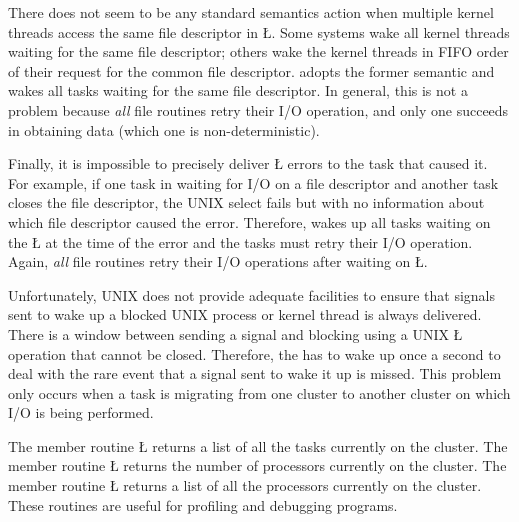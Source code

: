 \documentclass[openright,twoside]{report}
\begin{document}
There does not seem to be any standard semantics action when multiple kernel threads access the same file descriptor in \LGinlinetrue\LGbegin\lgrinde\L{}\endlgrinde\LGend{}.
Some systems wake all kernel threads waiting for the same file descriptor;
others wake the kernel threads in FIFO order of their request for the common file descriptor.
\uC adopts the former semantic and wakes all tasks waiting for the same file descriptor.
In general, this is not a problem because \emph{all} \uC file routines retry their I/O operation, and only one succeeds in obtaining data (which one is non-deterministic).

Finally, it is impossible to precisely deliver \LGinlinetrue\LGbegin\lgrinde\L{}\endlgrinde\LGend{} errors to the task that caused it.
For example, if one task in waiting for I/O on a file descriptor and another task closes the file descriptor, the UNIX select fails but with no information about which file descriptor caused the error.
Therefore, \uC wakes up all tasks waiting on the \LGinlinetrue\LGbegin\lgrinde\L{}\endlgrinde\LGend{} at the time of the error and the tasks must retry their I/O operation.
Again, \emph{all} \uC file routines retry their I/O operations after waiting on \LGinlinetrue\LGbegin\lgrinde\L{}\endlgrinde\LGend{}.

\begin{annotation}
Unfortunately, UNIX does not provide adequate facilities to ensure that signals sent to wake up a blocked UNIX process or kernel thread is always delivered.
There is a window between sending a signal and blocking using a UNIX \LGinlinetrue\LGbegin\lgrinde\L{}\endlgrinde\LGend{} operation that cannot be closed.
Therefore, the  has to wake up once a second to deal with the rare event that a signal sent to wake it up is missed.
This problem only occurs when a task is migrating from one cluster to another cluster on which I/O is being performed.
\end{annotation}

The member routine \LGinlinetrue\LGbegin\lgrinde\L{}\endlgrinde\LGend{} returns a list of all the tasks currently on the cluster.
The member routine \LGinlinetrue\LGbegin\lgrinde\L{}\endlgrinde\LGend{} returns the number of processors currently on the cluster.
The member routine \LGinlinetrue\LGbegin\lgrinde\L{}\endlgrinde\LGend{} returns a list of all the processors currently on the cluster.
These routines are useful for profiling and debugging programs.
\end{document}
